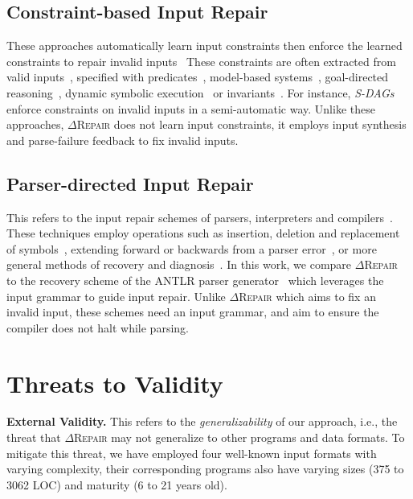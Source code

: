 \documentclass[acmsmall,screen,review,anonymous]{acmart}
\newcommand{\approach}{\textsc{$\Delta$Repair}\xspace}
\begin{document}
\subsection{Constraint-based Input Repair} %
These approaches automatically learn input constraints then enforce the learned constraints to repair invalid inputs~\cite{hussain2010dynamic, Demsky:2006:IED:1146238.1146266} 
These constraints are often extracted from valid inputs~\cite{Long:2012:AIR:2337223.2337233, Rinard:2007:LCZ:1297027.1297072}, specified with predicates~\cite{elkarablieh2008juzi}, model-based systems~\cite{Demsky:2003:ADR:949343.949314}, goal-directed reasoning~\cite{1553560}, dynamic symbolic execution~\cite{hussain2010dynamic} or invariants~\cite{Demsky:2006:IED:1146238.1146266}. For instance, \emph{S-DAGs}~\cite{scheffczyk2004s} enforce constraints on invalid inputs in a semi-automatic way. Unlike these approaches, \approach does not learn input constraints, it employs input synthesis and parse-failure feedback to fix invalid inputs. 


\subsection{Parser-directed Input Repair} %
This refers to the input repair schemes of parsers, interpreters and compilers~\cite{parr2011ll, diekmann2020dont, aho1972minimum, hammond1984survey, backhouse1979syntax}. 
These techniques employ operations such as insertion, deletion and replacement of symbols~\cite{anderson1981locally, cerecke2003locally, anderson1983assessment}, extending forward or backwards from a parser error~\cite{burke1982practical, mauney1982forward}, or more general methods of recovery and diagnosis~\cite{krawczyk1980error, aho1972minimum}. 
In this work, we compare \approach to the recovery scheme of the ANTLR parser generator~\cite{parr2011ll} which leverages the input grammar to guide input repair. %
Unlike \approach which aims to fix an invalid input, these schemes need an input grammar, and aim to ensure the compiler does not halt while parsing. 



\section{Threats to Validity}
\label{sec:threats}

\noindent\textbf{External Validity.} This refers to the \textit{generalizability} of our approach, i.e., 
the threat that \approach may not generalize to other programs and data formats. 
To mitigate this threat, we have employed four well-known input formats with varying complexity, their corresponding programs also have  varying sizes (375 to 3062 LOC) and maturity (6 to 21 years old). 
\end{document}
